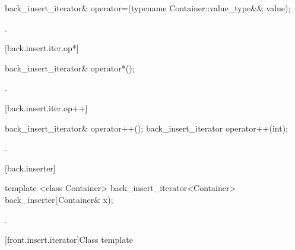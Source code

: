 %
\begin{itemdecl}
back_insert_iterator& operator=(typename Container::value_type&& value);
\end{itemdecl}

\begin{itemdescr}
\pnum
\effects
{}

\pnum
\returns
{}.
\end{itemdescr}

[back.insert.iter.op*]{}

%
\begin{itemdecl}
back_insert_iterator& operator*();
\end{itemdecl}

\begin{itemdescr}
\pnum
\returns
{}.
\end{itemdescr}

[back.insert.iter.op++]{}

%
\begin{itemdecl}
back_insert_iterator& operator++();
back_insert_iterator  operator++(int);
\end{itemdecl}

\begin{itemdescr}
\pnum
\returns
{}.
\end{itemdescr}

[back.inserter]{ }

%
\begin{itemdecl}
template <class Container>
  back_insert_iterator<Container> back_inserter(Container& x);
\end{itemdecl}

\begin{itemdescr}
\pnum
\returns
{}.
\end{itemdescr}

[front.insert.iterator]{Class template }

